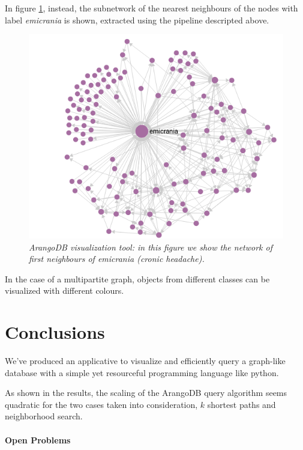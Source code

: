 \documentclass[11pt,twocolumn]{article}
\begin{document}
In figure \ref{fig:4}, instead, the subnetwork of the nearest neighbours of the nodes with label \textit{emicrania} is shown, extracted using the pipeline descripted above.

\begin{figure}[ht!]
   \includegraphics[width=\linewidth]{images/neigh_emicrania.png}
   \caption{\small{\textit{ArangoDB visualization tool: in this figure we show the network of first neighbours of \textit{emicrania} (cronic headache).}}}
   \label{fig:4}
\end{figure}

In the case of a multipartite graph, objects from different classes can be visualized with different colours.

\newpage

\section{Conclusions}
\balance %
We've produced an applicative to visualize and efficiently query a graph-like database with a simple yet resourceful programming language like python.

As shown in the results, the scaling of the ArangoDB query algorithm seems quadratic for the two cases taken into consideration, $k$ shortest paths and neighborhood search.

\paragraph{Open Problems}
\end{document}
